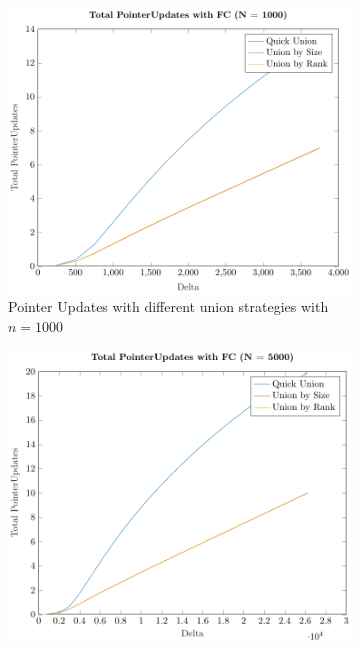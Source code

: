\begin{figure}[ht]
    \centering
    \begin{subfigure}{0.32\textwidth}
        \centering
        \includegraphics[width=\textwidth]{../images/plotFCFull1000_PointerUpdates.pdf}
        \caption{Pointer Updates with different union strategies with $n = 1000$}
    \end{subfigure}%
    \hfill
    \begin{subfigure}{0.32\textwidth}
        \centering
        \includegraphics[width=\textwidth]{../images/plotFCFull5000_PointerUpdates.pdf}

\end{subfigure}
\end{figure}
